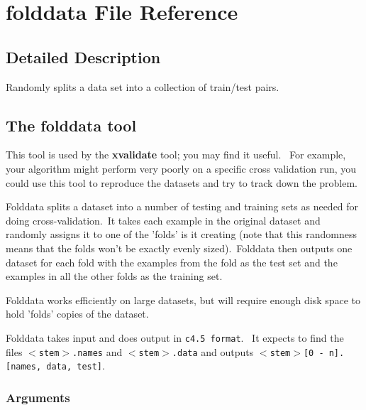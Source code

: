 \section{folddata File Reference}
\label{folddata}


\subsection{Detailed Description}
Randomly splits a data set into a collection of train/test pairs. 

\subsection*{The folddata tool}

This tool is used by the {\bf xvalidate} tool; you may find it useful. \  For example, your algorithm might perform very poorly on a specific cross validation run, you could use this tool to reproduce the datasets and try to track down the problem.

Folddata splits a dataset into a number of testing and training sets as needed for doing cross-validation.\  It takes each example in the original dataset and randomly assigns it to one of the 'folds' is it creating (note that this randomness means that the folds won't be exactly evenly sized).\  Folddata then outputs one dataset for each fold with the examples from the fold as the test set and the examples in all the other folds as the training set.

Folddata works efficiently on large datasets, but will require enough disk space to hold 'folds' copies of the dataset.

Folddata takes input and does output in {\tt c4.5 format}. \  It expects to find the files {\tt $<$stem$>$.names} and {\tt $<$stem$>$.data} and outputs {\tt $<$stem$>$[0 - n].[names, data, test]}.

\subsubsection*{Arguments}

